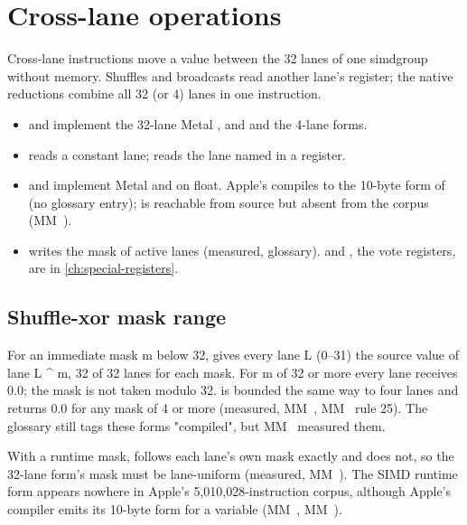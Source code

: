 \chapter{Cross-lane operations}\label{ch:cross-lane-operations}

Cross-lane instructions move a value between the 32 lanes of one simdgroup without memory. Shuffles and
broadcasts read another lane's register; the native reductions combine all 32 (or 4) lanes in one instruction.


\begin{itemize}
\item {} and  implement the 32-lane Metal , and  and 
  the 4-lane forms.
\item {} reads a constant lane;  reads the
  lane named in a register.
\item {} and  implement Metal  and  on float. Apple's 
  compiles to the 10-byte form of  (no glossary entry);  is reachable from source but absent from the
  corpus (MM~).
\item {} writes the mask of active lanes (measured, glossary).  and , the vote registers, are
  in \cref{ch:special-registers}.
\end{itemize}

\section{Shuffle-xor mask range}\label{sec:shuffle-xor-bounded-masks}

For an immediate mask m below 32,  gives every lane L (0--31) the source value of lane L \^{} m, 32 of 32
lanes for each mask. For m of 32 or more every lane receives 0.0; the mask is not taken modulo 32.  is bounded the same way to four lanes and returns 0.0 for any mask of 4
or more (measured, MM~, MM~ rule 25). The glossary still tags these forms "compiled", but MM~ measured them.

With a runtime mask,  follows each lane's own mask exactly and  does not, so the 32-lane form's
mask must be lane-uniform (measured, MM~). The SIMD runtime form appears nowhere in Apple's 5,010,028-instruction corpus, although Apple's compiler emits its 10-byte form for a
variable  (MM~, MM~).

